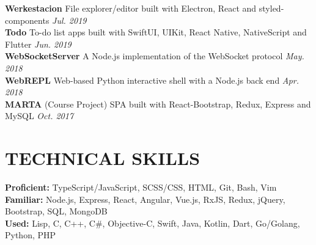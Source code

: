 \documentclass[12pt]{article}
\begin{document}
\vspace{0.5em}
%
\textbf{Werkestacion} \enspace File explorer/editor built with Electron, React and styled-components \hfill \textit{\color{gray} Jul. 2019}\\
\textbf{Todo} \enspace To-do list apps built with SwiftUI, UIKit, React Native, NativeScript and Flutter \hfill\textit{\color{gray} Jun. 2019}\\
\textbf{WebSocketServer}  \enspace A Node.js implementation of the WebSocket protocol \hfill\textit{\color{gray} May. 2018}\\
\textbf{WebREPL}  \enspace Web-based Python interactive shell with a Node.js back end \hfill\textit{\color{gray} Apr. 2018}\\
\textbf{MARTA} \enspace (Course Project) SPA built with React-Bootstrap, Redux, Express and MySQL \hfill\textit{\color{gray} Oct. 2017}
%
\section*{TECHNICAL SKILLS}
\textbf{Proficient:} TypeScript/JavaScript, SCSS/CSS, HTML, Git, Bash, Vim\\
\textbf{Familiar:} Node.js, Express, React, Angular, Vue.js, RxJS, Redux, jQuery, Bootstrap, SQL, MongoDB\\
\textbf{Used:} Lisp, C, C++, C\#, Objective-C, Swift, Java, Kotlin, Dart, Go/Golang, Python, PHP 
\end{document}

